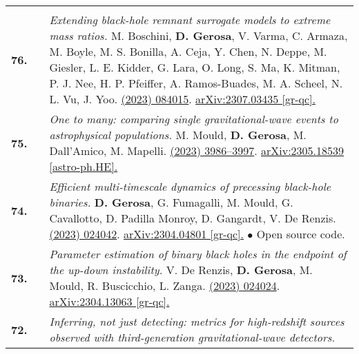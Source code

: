 {\begin{longtable}{rp{0.3cm}p{15.8cm}}
\vspace{0.09cm}\\
%
\textbf{76.} & & \textit{Extending black-hole remnant surrogate models to extreme mass ratios.}
\newline{}
M. Boschini, \textbf{D. Gerosa}, V. Varma, C. Armaza, M. Boyle, M. S. Bonilla, A. Ceja, Y. Chen, N. Deppe, M. Giesler, L. E. Kidder, G. Lara, O. Long, S. Ma, K. Mitman, P. J. Nee, H. P. Pfeiffer, A. Ramos-Buades, M. A. Scheel, N. L. Vu, J. Yoo.
\newline{}
\href{https://journals.aps.org/prd/abstract/10.1103/PhysRevD.108.084015}{\prd 108 (2023) 084015}. \href{https://arxiv.org/abs/2307.03435}{arXiv:2307.03435 [gr-qc].}
\vspace{0.09cm}\\
%
\textbf{75.} & & \textit{One to many: comparing single gravitational-wave events to astrophysical populations.}
\newline{}
M. Mould, \textbf{D. Gerosa}, M. Dall'Amico, M. Mapelli.
\newline{}
\href{https://doi.org/10.1093/mnras/stad2502}{\mnras 525 (2023) 3986–3997}. \href{https://arxiv.org/abs/2305.18539}{arXiv:2305.18539 [astro-ph.HE].}
\vspace{0.09cm}\\
%
\textbf{74.} & & \textit{Efficient multi-timescale dynamics of precessing black-hole binaries.}
\newline{}
\textbf{D. Gerosa}, G. Fumagalli, M. Mould, G. Cavallotto, D. Padilla Monroy, D. Gangardt, V. De Renzis.
\newline{}
\href{https://journals.aps.org/prd/abstract/10.1103/PhysRevD.108.024042}{\prd 108 (2023) 024042}. \href{https://arxiv.org/abs/2304.04801}{arXiv:2304.04801 [gr-qc].}
\newline{}
\textcolor{color1}{$\bullet$} Open source code.
\vspace{0.09cm}\\
%
\textbf{73.} & & \textit{Parameter estimation of binary black holes in the endpoint of the up-down instability.}
\newline{}
V. De Renzis, \textbf{D. Gerosa}, M. Mould, R. Buscicchio, L. Zanga.
\newline{}
\href{https://journals.aps.org/prd/abstract/10.1103/PhysRevD.108.024024}{\prd 108 (2023) 024024}. \href{https://arxiv.org/abs/2304.13063}{arXiv:2304.13063 [gr-qc].}
\vspace{0.09cm}\\
%
\textbf{72.} & & \textit{Inferring, not just detecting: metrics for high-redshift sources observed with third-generation gravitational-wave detectors.}

\end{longtable}}
